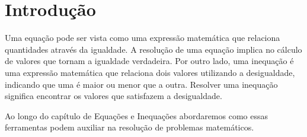\section{Introdução}

Uma equação pode ser vista como uma expressão matemática que relaciona quantidades através da igualdade. A resolução de uma equação implica no cálculo de valores que tornam a igualdade verdadeira. Por outro lado, uma inequação é uma expressão matemática que relaciona dois valores utilizando a desigualdade, indicando que uma é maior ou menor que a outra. Resolver uma inequação significa encontrar os valores que satisfazem a desigualdade. 

Ao longo do capítulo de Equações e Inequações abordaremos como essas ferramentas podem auxiliar na resolução de problemas matemáticos. 
